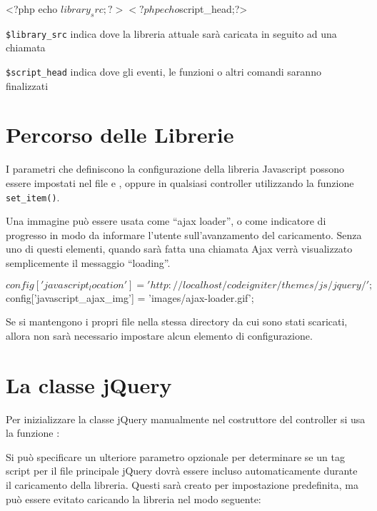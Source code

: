 \begin{code}
<?php echo $library_src;?>
<?php echo $script_head;?>
\end{code}

\verb|$library_src| indica dove la libreria attuale sarà caricata in seguito ad una chiamata

\verb|$script_head| indica dove gli eventi, le funzioni o altri comandi saranno finalizzati

\section*{Percorso delle Librerie}
I parametri che definiscono la configurazione della libreria Javascript possono essere impostati nel file  e , oppure in qualsiasi controller utilizzando la funzione \verb|set_item()|.

Una immagine può essere usata come ``ajax loader'', o come indicatore di progresso in modo da informare l'utente sull'avanzamento del caricamento. Senza uno di questi elementi, quando sarà fatta una chiamata Ajax verrà visualizzato semplicemente il messaggio ``loading''.

\begin{code}
$config['javascript_location'] = 'http://localhost/codeigniter/themes/js/jquery/';
$config['javascript_ajax_img'] = 'images/ajax-loader.gif';
\end{code}

Se si mantengono i propri file nella stessa directory da cui sono stati scaricati, allora non sarà necessario impostare alcun elemento di configurazione.

\section*{La classe jQuery}
Per inizializzare la classe jQuery manualmente nel costruttore del controller si usa la funzione :


Si può specificare un ulteriore parametro opzionale per determinare se un tag script per il file principale jQuery dovrà essere incluso automaticamente durante il caricamento della libreria. Questi sarà creato per impostazione predefinita, ma può essere evitato caricando la libreria nel modo seguente:

